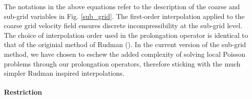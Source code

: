 The notations in the above equations refer to the description 
of the coarse and sub-grid variables in Fig. \ref{sub_grid}. 
The first-order interpolation applied to the coarse grid 
velocity field ensures discrete incompressibility 
at the sub-grid level.
The choice of interpolation order used in the  prolongation operator 
is identical to that of the originial method of Rudman (\cite{rudman1998volume}). 
In the current version of the sub-grid method, we have chosen to eschew the added 
complexity of solving local Poisson problems 
through our prolongation operators, therefore sticking with 
the much simpler Rudman inspired interpolations. 


\paragraph{\textbf{Restriction}}


